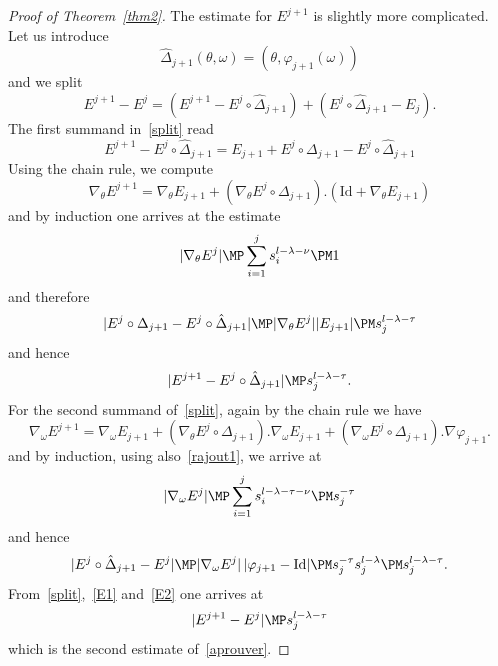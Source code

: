 \begin{proof}[Proof of Theorem~\ref{thm2}]
The estimate for $E^{j+1}$ is slightly more complicated. Let us introduce
\[ \hat{\Delta}_{j+1}(\theta,\omega)=(\theta,\varphi_{j+1}(\omega)) \]
and we split
\begin{equation}\label{split}
E^{j+1}-E^{j}=(E^{j+1}-E^j \circ \hat{\Delta}_{j+1})+(E^j \circ \hat{\Delta}_{j+1}-E_j).
\end{equation}
The first summand in~\eqref{split} read
\[ E^{j+1}-E^j \circ \hat{\Delta}_{j+1}=E_{j+1}+E^j \circ \Delta_{j+1}-E^j \circ \hat{\Delta}_{j+1} \]
Using the chain rule, we compute
\[ \nabla_\theta E^{j+1}=\nabla_\theta E_{j+1}+(\nabla_\theta E^{j} \circ \Delta_{j+1}).(\mathrm{Id}+\nabla_\theta E_{j+1}) \]
and by induction one arrives at the estimate
\begin{equation}\label{rajout1}
|\nabla_\theta E^j| \MP \sum_{i=1}^j s_i^{l-\lambda-\nu} \PM 1
\end{equation}
and therefore
\[ |E^j \circ \Delta_{j+1}-E^j \circ \hat{\Delta}_{j+1}| \MP |\nabla_\theta E^j||E_{j+1}| \PM s_j^{l-\lambda-\tau} \]
and hence
\begin{equation}\label{E1}
|E^{j+1}-E^j \circ \hat{\Delta}_{j+1}| \MP s_j^{l-\lambda-\tau}.
\end{equation}
For the second summand of~\eqref{split}, again by the chain rule we have
\[ \nabla_\omega E^{j+1}=\nabla_\omega E_{j+1}+(\nabla_\theta E^{j} \circ \Delta_{j+1}).\nabla_\omega E_{j+1}+(\nabla_\omega E^{j} \circ \Delta_{j+1}).\nabla \varphi_{j+1}. \]
and by induction, using also~\eqref{rajout1}, we arrive at
\begin{equation*}
|\nabla_\omega E^j| \MP \sum_{i=1}^j s_i^{l-\lambda-\tau-\nu} \PM s_j^{-\tau}
\end{equation*}
and hence
\begin{equation}\label{E2}
|E^j \circ \hat{\Delta}_{j+1}-E^j| \MP |\nabla_\omega E^j|\,|\varphi_{j+1}-\mathrm{Id}| \PM s_j^{-\tau} s_j^{l-\lambda} \PM s_j^{l-\lambda-\tau} .
\end{equation}
From~\eqref{split},~\eqref{E1} and~\eqref{E2} one arrives at
\[ |E^{j+1} -E^j| \MP s_j^{l-\lambda-\tau} \]
which is the second estimate of~\eqref{aprouver}.


\end{proof}
